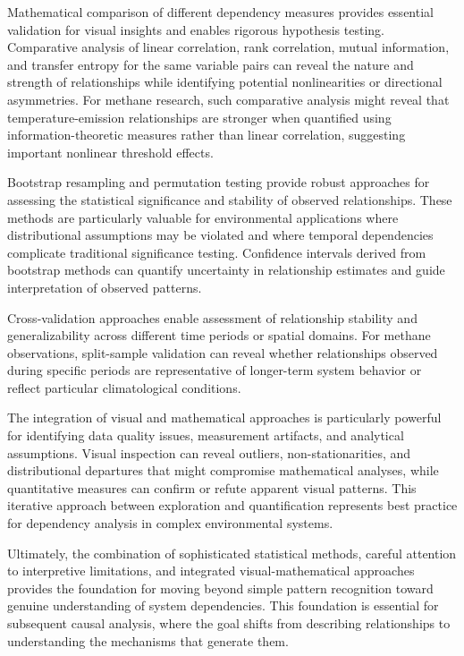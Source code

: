 Mathematical comparison of different dependency measures provides essential validation for visual insights and enables rigorous hypothesis testing. Comparative analysis of linear correlation, rank correlation, mutual information, and transfer entropy for the same variable pairs can reveal the nature and strength of relationships while identifying potential nonlinearities or directional asymmetries. For methane research, such comparative analysis might reveal that temperature-emission relationships are stronger when quantified using information-theoretic measures rather than linear correlation, suggesting important nonlinear threshold effects.

Bootstrap resampling and permutation testing provide robust approaches for assessing the statistical significance and stability of observed relationships. These methods are particularly valuable for environmental applications where distributional assumptions may be violated and where temporal dependencies complicate traditional significance testing. Confidence intervals derived from bootstrap methods can quantify uncertainty in relationship estimates and guide interpretation of observed patterns.

Cross-validation approaches enable assessment of relationship stability and generalizability across different time periods or spatial domains. For methane observations, split-sample validation can reveal whether relationships observed during specific periods are representative of longer-term system behavior or reflect particular climatological conditions.

The integration of visual and mathematical approaches is particularly powerful for identifying data quality issues, measurement artifacts, and analytical assumptions. Visual inspection can reveal outliers, non-stationarities, and distributional departures that might compromise mathematical analyses, while quantitative measures can confirm or refute apparent visual patterns. This iterative approach between exploration and quantification represents best practice for dependency analysis in complex environmental systems.

Ultimately, the combination of sophisticated statistical methods, careful attention to interpretive limitations, and integrated visual-mathematical approaches provides the foundation for moving beyond simple pattern recognition toward genuine understanding of system dependencies. This foundation is essential for subsequent causal analysis, where the goal shifts from describing relationships to understanding the mechanisms that generate them.

